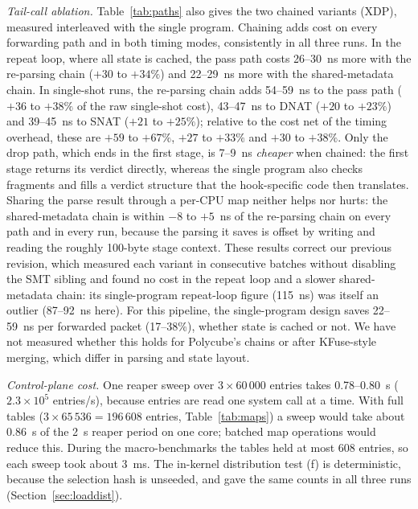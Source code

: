 \documentclass[conference]{IEEEtran}
\begin{document}
\textit{Tail-call ablation.} Table~\ref{tab:paths} also gives the two chained
variants (XDP), measured interleaved with the single program. Chaining adds
cost on every forwarding path and in both timing modes, consistently in all
three runs. In the repeat loop, where all state is cached, the pass path
costs 26--30~ns more with the re-parsing chain ($+30$ to $+34\%$) and
22--29~ns more with the shared-metadata chain. In single-shot runs, the
re-parsing chain adds 54--59~ns to the pass path ($+36$ to $+38\%$ of the
raw single-shot cost), 43--47~ns to DNAT ($+20$ to $+23\%$) and 39--45~ns to
SNAT ($+21$ to $+25\%$); relative to the cost net of the timing overhead,
these are $+59$ to $+67\%$, $+27$ to $+33\%$ and $+30$ to $+38\%$. Only the
drop path, which ends in the first stage, is 7--9~ns \emph{cheaper} when
chained: the first stage returns its verdict directly, whereas the single
program also checks fragments and fills a verdict structure that the
hook-specific code then translates. Sharing the parse result through a
per-CPU map neither helps nor hurts: the shared-metadata chain is within
$-8$ to $+5$~ns of the re-parsing chain on every path and in every run,
because the parsing it saves is offset by writing and reading the roughly
100-byte stage context. These results correct our previous revision, which
measured each variant in consecutive batches without disabling the SMT
sibling and found no cost in the repeat loop and a slower shared-metadata
chain: its single-program repeat-loop figure (115~ns) was itself an outlier
(87--92~ns here). For this pipeline, the single-program design saves
22--59~ns per forwarded packet (17--38\%), whether state is cached or not.
We have not measured whether this holds for Polycube's chains or after
KFuse-style merging, which differ in parsing and state layout.

\textit{Control-plane cost.} One reaper sweep over $3\times60\,000$ entries
takes 0.78--0.80~s ($2.3\times10^5$ entries/s), because entries are read one
system call at a time. With full tables ($3\times65\,536=196\,608$ entries,
Table~\ref{tab:maps}) a sweep would take about 0.86~s of the 2~s reaper
period on one core; batched map operations would reduce this. During the
macro-benchmarks the tables held at most 608 entries, so each sweep took
about 3~ms. The in-kernel distribution test (f) is deterministic, because the
selection hash is unseeded, and gave the same counts in all three runs
(Section~\ref{sec:loaddist}).
\end{document}
